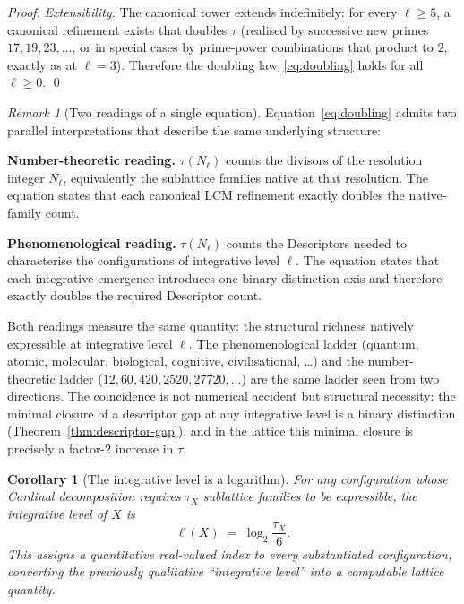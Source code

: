 \documentclass[11pt,a4paper]{article}
\newtheorem{corollary}[theorem]{Corollary}
\theoremstyle{definition}
\theoremstyle{remark}
\newtheorem{remark}[theorem]{Remark}
\begin{document}
\begin{proof}
\emph{Extensibility.} The canonical tower extends indefinitely: for every $\ell\ge 5$, a canonical refinement exists that doubles $\tau$ (realised by successive new primes $17,19,23,\ldots$, or in special cases by prime-power combinations that product to $2$, exactly as at $\ell=3$). Therefore the doubling law~\eqref{eq:doubling} holds for all $\ell\ge 0$. \qed
\end{proof}

\begin{remark}[Two readings of a single equation]\label{rem:two-readings}
Equation~\eqref{eq:doubling} admits two parallel interpretations that describe the same underlying structure:

\textbf{Number-theoretic reading.} $\tau(N_{\ell})$ counts the divisors of the resolution integer $N_{\ell}$, equivalently the sublattice families native at that resolution. The equation states that each canonical LCM refinement exactly doubles the native-family count.

\textbf{Phenomenological reading.} $\tau(N_{\ell})$ counts the Descriptors needed to characterise the configurations of integrative level $\ell$. The equation states that each integrative emergence introduces one binary distinction axis and therefore exactly doubles the required Descriptor count.

Both readings measure the same quantity: the structural richness natively expressible at integrative level $\ell$. The phenomenological ladder (quantum, atomic, molecular, biological, cognitive, civilisational, \ldots) and the number-theoretic ladder ($12, 60, 420, 2520, 27720, \ldots$) are the same ladder seen from two directions. The coincidence is not numerical accident but structural necessity: the minimal closure of a descriptor gap at any integrative level is a binary distinction (Theorem~\ref{thm:descriptor-gap}), and in the lattice this minimal closure is precisely a factor-$2$ increase in $\tau$.
\end{remark}

\begin{corollary}[The integrative level is a logarithm]\label{cor:level-log}
For any configuration whose Cardinal decomposition requires $\tau_{X}$ sublattice families to be expressible, the integrative level of $X$ is
\[
\ell(X) \;=\; \log_{2}\!\frac{\tau_{X}}{6}.
\]
This assigns a quantitative real-valued index to every substantiated configuration, converting the previously qualitative ``integrative level'' into a computable lattice quantity.
\end{corollary}
\end{document}
